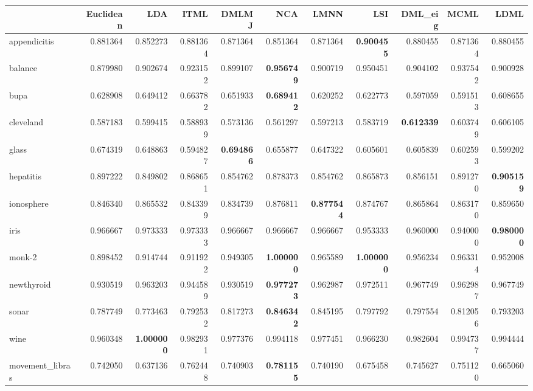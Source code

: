 \begin{tabular}{lrrrrrrrrrr}
\toprule
{} &  Euclidean &       LDA &      ITML &     DMLMJ &       NCA &      LMNN &       LSI &   DML\_eig &      MCML &      LDML \\
\midrule
appendicitis    &   0.881364 &  0.852273 &  0.881364 &  0.871364 &  0.851364 &  0.871364 &  \textbf{0.900455} &  0.880455 &  0.871364 &  0.880455 \\
balance         &   0.879980 &  0.902674 &  0.923152 &  0.899107 &  \textbf{0.956749} &  0.900719 &  0.950451 &  0.904102 &  0.937542 &  0.900928 \\
bupa            &   0.628908 &  0.649412 &  0.663782 &  0.651933 &  \textbf{0.689412} &  0.620252 &  0.622773 &  0.597059 &  0.591513 &  0.608655 \\
cleveland       &   0.587183 &  0.599415 &  0.588939 &  0.573136 &  0.561297 &  0.597213 &  0.583719 &  \textbf{0.612339} &  0.603749 &  0.606105 \\
glass           &   0.674319 &  0.648863 &  0.594827 &  \textbf{0.694866} &  0.655877 &  0.647322 &  0.605601 &  0.605839 &  0.602593 &  0.599202 \\
hepatitis       &   0.897222 &  0.849802 &  0.868651 &  0.854762 &  0.878373 &  0.854762 &  0.865873 &  0.856151 &  0.891270 &  \textbf{0.905159} \\
ionosphere      &   0.846340 &  0.865532 &  0.843399 &  0.834739 &  0.876811 &  \textbf{0.877544} &  0.874767 &  0.865864 &  0.863170 &  0.859650 \\
iris            &   0.966667 &  0.973333 &  0.973333 &  0.966667 &  0.966667 &  0.966667 &  0.953333 &  0.960000 &  0.940000 &  \textbf{0.980000} \\
monk-2          &   0.898452 &  0.914744 &  0.911922 &  0.949305 &  \textbf{1.000000} &  0.965589 &  \textbf{1.000000} &  0.956234 &  0.963314 &  0.952008 \\
newthyroid      &   0.930519 &  0.963203 &  0.944589 &  0.930519 &  \textbf{0.977273} &  0.962987 &  0.972511 &  0.967749 &  0.962987 &  0.967749 \\
sonar           &   0.787749 &  0.773463 &  0.792532 &  0.817273 &  \textbf{0.846342} &  0.845195 &  0.797792 &  0.797554 &  0.812056 &  0.793203 \\
wine            &   0.960348 &  \textbf{1.000000} &  0.982931 &  0.977376 &  0.994118 &  0.977451 &  0.966230 &  0.982604 &  0.994737 &  0.994444 \\
movement\_libras &   0.742050 &  0.637136 &  0.762448 &  0.740903 &  \textbf{0.781155} &  0.740190 &  0.675458 &  0.745627 &  0.751120 &  0.665060 \\

\end{tabular}
